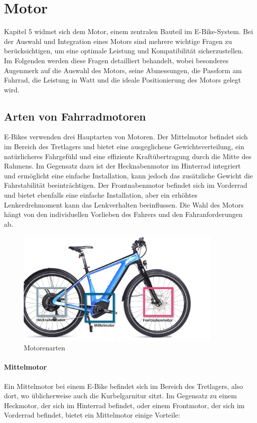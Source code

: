 \chapter{Motor}


Kapitel 5 widmet sich dem Motor, einem zentralen Bauteil im E-Bike-System. Bei der Auswahl und Integration eines Motors sind mehrere wichtige Fragen zu berücksichtigen, um eine optimale Leistung und Kompatibilität sicherzustellen. Im Folgenden werden diese Fragen detailliert behandelt, wobei besonderes Augenmerk auf die Auswahl des Motors, seine Abmessungen, die Passform am Fahrrad, die Leistung in Watt und die ideale Positionierung des Motors gelegt wird.
\section{Arten von Fahrradmotoren}
E-Bikes verwenden drei Hauptarten von Motoren. Der Mittelmotor befindet sich im Bereich des Tretlagers und bietet eine ausgeglichene Gewichtsverteilung, ein natürlicheres Fahrgefühl und eine effiziente Kraftübertragung durch die Mitte des Rahmens. Im Gegensatz dazu ist der Hecknabenmotor im Hinterrad integriert und ermöglicht eine einfache Installation, kann jedoch das zusätzliche Gewicht die Fahrstabilität beeinträchtigen. Der Frontnabenmotor befindet sich im Vorderrad und bietet ebenfalls eine einfache Installation, aber ein erhöhtes Lenkerdrehmoment kann das Lenkverhalten beeinflussen. Die Wahl des Motors hängt von den individuellen Vorlieben des Fahrers und den Fahranforderungen ab.
\begin{figure}[h]
    \centering
    \includegraphics[width=10cm]{images/Kaufberatung-Motor-1.jpg}
    \caption{Motorenarten\cite{noauthor_e-bike_nodate}}%
    \label{fig:7}
\end{figure}

\subsubsection*{Mittelmotor}
Ein Mittelmotor bei einem E-Bike befindet sich im Bereich des Tretlagers, also dort, wo üblicherweise auch die Kurbelgarnitur sitzt. Im Gegensatz zu einem Heckmotor, der sich im Hinterrad befindet, oder einem Frontmotor, der sich im Vorderrad befindet, bietet ein Mittelmotor einige Vorteile:\\

